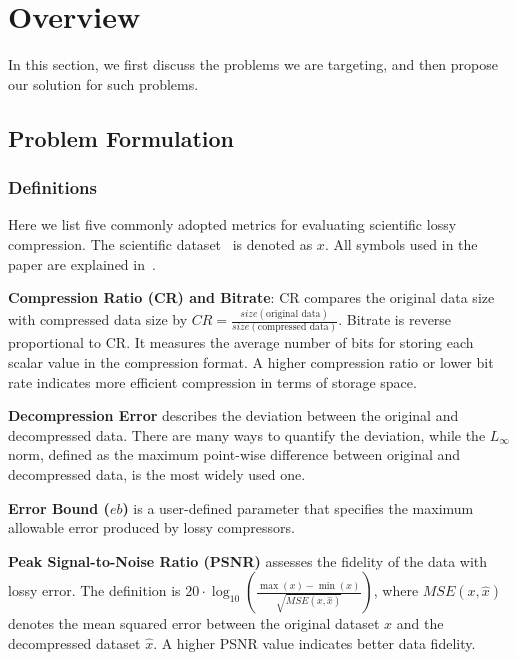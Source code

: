 \section{Overview}
\label{sec:overview}
In this section, we first discuss the problems we are targeting, and then propose our solution for such problems. 

\subsection{Problem Formulation}
\label{sec: problem formulation}




\subsubsection{Definitions}
\label{sec:definitions}

Here we list five commonly adopted metrics for evaluating scientific lossy compression. The scientific dataset~\cite{sdrbench} is denoted as $x$. All symbols used in the paper are explained in~.

\noindent \textbf{Compression Ratio (CR) and Bitrate}: CR compares the original data size with compressed data size by $CR = \frac{size(\text{original data})}{size(\text{compressed data})}$. Bitrate is reverse proportional to CR. It measures the average number of bits for storing each scalar value in the compression format. A higher compression ratio or lower bit rate indicates more efficient compression in terms of storage space.
    
\noindent    \textbf{Decompression Error} describes the deviation between the original and decompressed data. There are many ways to quantify the deviation, while the $L_\infty$ norm, defined as the maximum point-wise difference between original and decompressed data, is the most widely used one. 

\noindent \textbf{Error Bound ($eb$)} is a user-defined parameter that specifies the maximum allowable error produced by lossy compressors. 

\noindent    \textbf{Peak Signal-to-Noise Ratio (PSNR)} assesses the fidelity of the data with lossy error. The definition is $20 \cdot \log_{10} \left( \frac{\max(x) - \min(x)}{\sqrt{MSE(x, \hat{x})}} \right)$, where $MSE(x, \hat x)$ denotes the mean squared error between the original dataset $x$ and the decompressed dataset $\hat x$. A higher PSNR value indicates better data fidelity.


